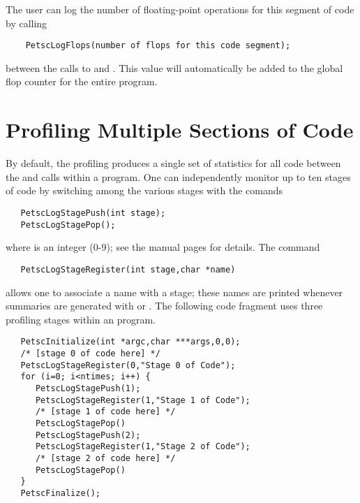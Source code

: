 The user can log the number of floating-point operations 
for this segment of code by calling 
\begin{verbatim}
    PetscLogFlops(number of flops for this code segment);
\end{verbatim}
between the calls to  and .
This value will automatically be added to the global flop counter for the
entire program.

\section{Profiling Multiple Sections of Code}
\label{sec:profstages}

By default, the profiling produces a single set of statistics for all
code between the  and 
calls within a program.  One can independently monitor up to ten
stages of code by switching among the various stages with the comands
 
\begin{verbatim}
   PetscLogStagePush(int stage);
   PetscLogStagePop();
\end{verbatim}
where  is an integer (0-9); see the manual pages for details.
The command  
\begin{verbatim}
   PetscLogStageRegister(int stage,char *name)
\end{verbatim}
allows one to associate a name with a stage; these names are printed whenever
summaries are generated with  or .
The following code fragment uses three profiling stages within an program.

\begin{verbatim}
   PetscInitialize(int *argc,char ***args,0,0);
   /* [stage 0 of code here] */
   PetscLogStageRegister(0,"Stage 0 of Code");
   for (i=0; i<ntimes; i++) {
      PetscLogStagePush(1);
      PetscLogStageRegister(1,"Stage 1 of Code");
      /* [stage 1 of code here] */
      PetscLogStagePop()
      PetscLogStagePush(2);
      PetscLogStageRegister(1,"Stage 2 of Code");
      /* [stage 2 of code here] */
      PetscLogStagePop()
   }
   PetscFinalize();
\end{verbatim}

